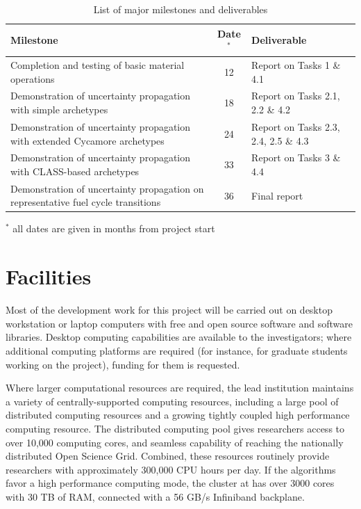 \documentclass[dvips,12pt]{article}
\begin{document}
\begin{table}
\caption{List of major milestones and deliverables}
\begin{tabularx}{
\textwidth}{|X|c|l|}\hline
 \textbf{Milestone}       & 
     \textbf{Date}$^*$&
     \textbf{Deliverable} \\\hline
 Completion and testing of basic material operations      &   
     12                         & 
     Report on Tasks 1 \& 4.1   \\\hline
 Demonstration of uncertainty propagation with simple archetypes  &   
     18       & 
     Report on Tasks 2.1, 2.2 \& 4.2 \\\hline
 Demonstration of uncertainty propagation with extended Cycamore archetypes &
     24       &
     Report on Tasks 2.3, 2.4, 2.5 \& 4.3 \\\hline
 Demonstration of uncertainty propagation with CLASS-based archetypes &
     33       &
     Report on Tasks 3 \& 4.4 \\\hline
 Demonstration of uncertainty propagation on representative fuel cycle transitions &
     36       &
     Final report\\\hline
\end{tabularx}
{\footnotesize $^*$ all dates are given in months from project start}
\end{table}

\section{Facilities}

Most of the development work for this project will
be carried out on desktop workstation or laptop
computers with free and open source software
and software libraries. Desktop computing
capabilities are available to the investigators;
where additional computing platforms are required
(for instance, for graduate students working on
the project), funding for them is requested.

Where larger computational resources are required,
the lead institution maintains a variety of
centrally-supported computing resources, including
a large pool of distributed computing resources
and a growing tightly coupled high performance
computing resource. The distributed computing pool
gives researchers access to over 10,000 computing
cores, and seamless capability of reaching the
nationally distributed Open Science
Grid. Combined, these resources routinely provide
researchers with approximately 300,000 CPU hours
per day. If the algorithms favor a high
performance computing mode, the cluster at has
over 3000 cores with 30 TB of RAM, connected with
a 56 GB/s Infiniband backplane.
\end{document}
